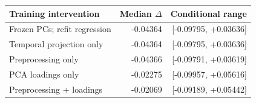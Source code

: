 \begin{tabular}{lrr}
\toprule
Training intervention & Median $\Delta$ & Conditional range \\
\midrule
Frozen PCs; refit regression & -0.04364 & [-0.09795, +0.03636] \\
Temporal projection only & -0.04364 & [-0.09795, +0.03636] \\
Preprocessing only & -0.04366 & [-0.09791, +0.03619] \\
PCA loadings only & -0.02275 & [-0.09957, +0.05616] \\
Preprocessing + loadings & -0.02069 & [-0.09189, +0.05442] \\
\bottomrule
\end{tabular}
